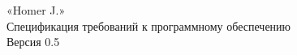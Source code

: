 \begin{titlepage}
	\centering
\vspace{12cm}

    
{\LARGE «Homer J.»\\
Спецификация требований к программному обеспечению\\
Версия 0.5\\
}
\vfill

\end{titlepage}